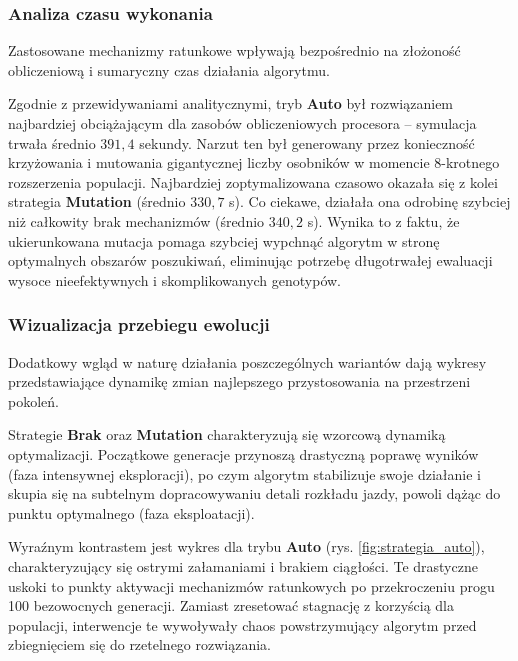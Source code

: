 \subsubsection*{Analiza czasu wykonania}
Zastosowane mechanizmy ratunkowe wpływają bezpośrednio na złożoność obliczeniową i sumaryczny czas działania algorytmu.


Zgodnie z przewidywaniami analitycznymi, tryb \textbf{Auto} był rozwiązaniem najbardziej obciążającym dla zasobów obliczeniowych procesora – symulacja trwała średnio $391,4$ sekundy. Narzut ten był generowany przez konieczność krzyżowania i mutowania gigantycznej liczby osobników w momencie 8-krotnego rozszerzenia populacji. Najbardziej zoptymalizowana czasowo okazała się z kolei strategia \textbf{Mutation} (średnio $330,7$ s). Co ciekawe, działała ona odrobinę szybciej niż całkowity brak mechanizmów (średnio $340,2$ s). Wynika to z faktu, że ukierunkowana mutacja pomaga szybciej wypchnąć algorytm w stronę optymalnych obszarów poszukiwań, eliminując potrzebę długotrwałej ewaluacji wysoce nieefektywnych i skomplikowanych genotypów.

\subsubsection{Wizualizacja przebiegu ewolucji}
Dodatkowy wgląd w naturę działania poszczególnych wariantów dają wykresy przedstawiające dynamikę zmian najlepszego przystosowania na przestrzeni pokoleń.


Strategie \textbf{Brak} oraz \textbf{Mutation} charakteryzują się wzorcową dynamiką optymalizacji. Początkowe generacje przynoszą drastyczną poprawę wyników (faza intensywnej eksploracji), po czym algorytm stabilizuje swoje działanie i skupia się na subtelnym dopracowywaniu detali rozkładu jazdy, powoli dążąc do punktu optymalnego (faza eksploatacji).

Wyraźnym kontrastem jest wykres dla trybu \textbf{Auto} (rys. \ref{fig:strategia_auto}), charakteryzujący się ostrymi załamaniami i brakiem ciągłości. Te drastyczne uskoki to punkty aktywacji mechanizmów ratunkowych po przekroczeniu progu 100 bezowocnych generacji. Zamiast zresetować stagnację z korzyścią dla populacji, interwencje te wywoływały chaos powstrzymujący algorytm przed zbiegnięciem się do rzetelnego rozwiązania.

